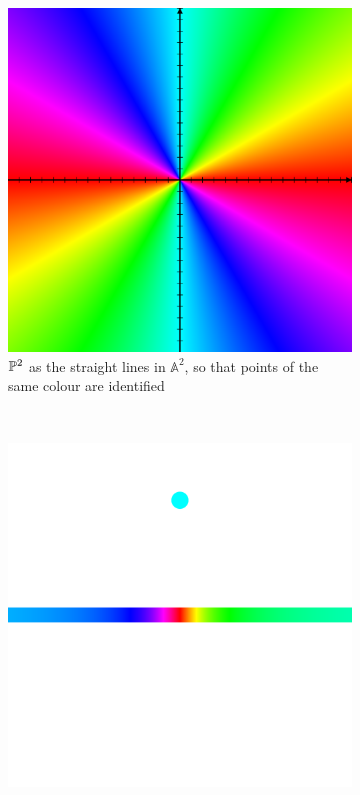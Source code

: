 \documentclass[10pt,a4paper,rgb]{article}
\newcommand{\A}{\mathbb{A}}
\begin{document}
\begin{figure}[H]
\centering
\begin{subfigure}{.5\textwidth}
\includegraphics[scale=.1]{plane.png}
\caption{$\P^2$ as the straight lines in $\A^2$, so that points of the same colour are identified}
\end{subfigure}\\
\begin{subfigure}{.4\textwidth}
\includegraphics[scale=.1]{line.png}

\end{subfigure}
\end{figure}
\end{document}
